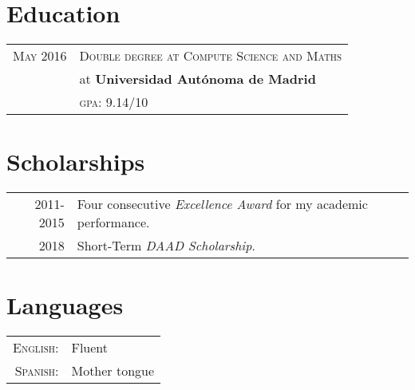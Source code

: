 \documentclass[a4paper,10pt]{article} %
\begin{document}

\section{Education}
\begin{tabular}{rl}

\textsc{May} 2016 & \textsc{Double degree at Compute Science and Maths}\\
& at \textbf{Universidad Autónoma de Madrid} \\
& \normalsize \textsc{gpa}: 9.14/10 \\
\end{tabular}


\section{Scholarships}

\begin{tabular}{rl}

\textsc{2011-2015} & Four consecutive \emph{Excellence Award} for my academic performance. \\

\textsc{2018} & Short-Term \emph{DAAD Scholarship}. \\

\end{tabular}


\section{Languages}

\begin{tabular}{rl}
\textsc{English:} & Fluent\\

\textsc{Spanish:} & Mother tongue\\

\end{tabular}

\end{document}
